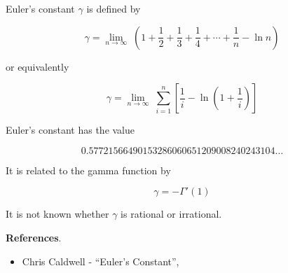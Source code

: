 \documentclass[12pt]{article}
\begin{document}
Euler's constant $\gamma$ is defined by 

$$ \gamma = \lim_{n\rightarrow \infty}\; \left(1 + \frac{1}{2} + \frac{1}{3} + \frac{1}{4} + \cdots + \frac{1}{n} - \ln {n}\right) $$

or equivalently

$$ \gamma = \lim_{n\rightarrow \infty}\; \sum_{i=1}^n \left[\frac{1}{i} - \ln \left( 1 + \frac{1}{i} \right) \right] $$

Euler's constant has the value

$$ 0.57721566490153286060651209008240243104\ldots $$

It is related to the gamma function by

$$ \gamma = - \Gamma'(1) $$

It is not known whether $\gamma$ is rational or irrational.

{\bf References}.

\begin{itemize}

\item  Chris Caldwell - ``Euler's Constant'', 

\end{itemize}
\end{document}
